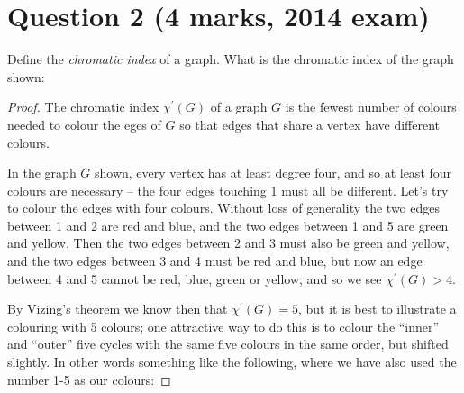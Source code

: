 \documentclass{amsart}
\begin{document}
\section*{Question 2 (4 marks, 2014 exam)}

Define the \emph{chromatic index} of a graph.  What is the chromatic index of the graph shown:

 \begin{proof}
   The chromatic index $\chi^\prime(G)$ of a graph $G$ is the fewest number of colours needed to colour the eges of $G$ so that edges that share a vertex have different colours.

   In the graph $G$ shown, every vertex has at least degree four, and so at least four colours are necessary -- the four edges touching 1 must all be different.  Let's try to colour the edges with four colours.  Without loss of generality the two edges between 1 and 2 are red and blue, and the two edges between 1 and 5 are green and yellow.  Then the two edges between 2 and 3 must also be green and yellow, and the two edges between 3 and 4 must be red and blue, but now an edge between 4 and 5 cannot be red, blue, green or yellow, and so we see $\chi^\prime(G)>4$.

   By Vizing's theorem we know then that $\chi^\prime(G)=5$, but it is best to illustrate a colouring with 5 colours; one attractive way to do this is to colour the ``inner'' and ``outer'' five cycles with the same five colours in the same order, but shifted slightly.  In other words something like the following, where we have also used the number 1-5 as our colours:


 \end{proof}
\end{document}
